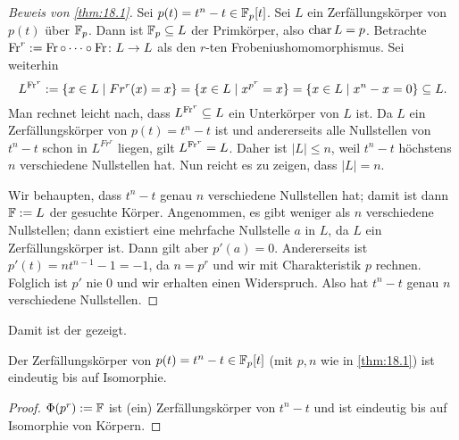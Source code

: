 \documentclass[12pt,a4paper]{scrartcl}
\begin{document}
\begin{proof}[Beweis von \cref{thm:18.1}]
	Sei $p(t) = t^n-t\in\mathbb F_p[t]$. Sei $L$ ein Zerfällungskörper von $p(t)$ über $\mathbb F_p$. Dann ist $\mathbb F_p\subseteq L$ der Primkörper, also $\operatorname{char} L = p$. Betrachte $\operatorname{Fr}^r : = \operatorname{Fr}\circ\dots\circ \operatorname{Fr}\colon L\to L$ als den $r$-ten Frobeniushomomorphismus. Sei weiterhin
	\[L^{\operatorname{Fr}^r} := \{x\in L\mid Fr^r(x) = x\} = \{x\in L\mid x^{p^r} = x\} = \{x\in L\mid x^n -x = 0\}\subseteq L.\]
	Man rechnet leicht nach, dass $L^{\operatorname{Fr}^r}\subseteq L$ ein Unterkörper von $L$ ist. Da $L$ ein Zerfällungskörper von $p(t ) = t^n-t$ ist und andererseits alle Nullstellen von $t^n-t$ schon in $L^{Fr^r}$ liegen, gilt $L^{\operatorname{Fr}^r} = L$. Daher ist $|L|\leq n$, weil $t^n-t$ höchstens $n$ verschiedene Nullstellen hat. Nun reicht es zu zeigen, dass $|L| = n$.
	
	Wir behaupten, dass $t^n-t$ genau $n$ verschiedene Nullstellen hat; damit ist dann $\mathbb F := L$ der gesuchte Körper. Angenommen, es gibt weniger als $n$ verschiedene Nullstellen; dann existiert eine mehrfache Nullstelle $a$ in $L$, da $L$ ein Zerfällungskörper ist. Dann gilt aber $p'(a) = 0$. Andererseits ist $p'(t) = nt^{n-1}-1 = -1$, da $n = p^r$ und wir mit Charakteristik $p$ rechnen. Folglich ist $p'$ nie $0$ und wir erhalten einen Widerspruch. Also hat $t^n-t$ genau $n$ verschiedene Nullstellen.	
\end{proof}

Damit ist der  gezeigt.

\begin{kor}
	Der Zerfällungskörper von $p(t) = t^n-t\in\mathbb F_p[t]$ \textup(mit $p,n$ wie in \cref{thm:18.1}\textup) ist eindeutig bis auf Isomorphie.
\end{kor}
\begin{proof}
	$\Phi(p^r) := \mathbb F$ ist (ein) Zerfällungskörper von $t^n-t$ und ist eindeutig bis auf Isomorphie von Körpern.
\end{proof}	
\end{document}
